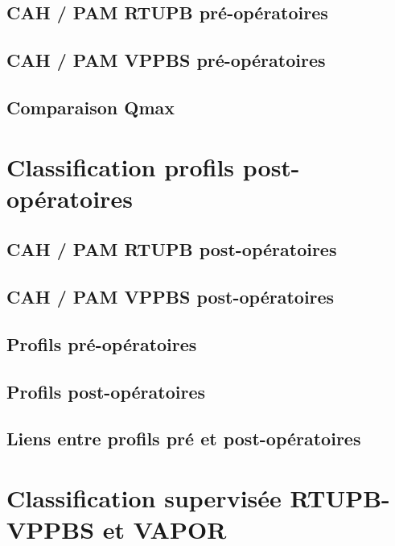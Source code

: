\documentclass[12pt]{article}
\begin{document}
\subsection{CAH / PAM RTUPB pré-opératoires }
	  
\subsection{CAH / PAM VPPBS  pré-opératoires }
	  
\subsection{Comparaison Qmax }
	  

%


\section{Classification profils post-opératoires}
\subsection{CAH / PAM RTUPB post-opératoires}
	  
\subsection{CAH / PAM VPPBS post-opératoires}
	  
\subsection{Profils pré-opératoires}
	  
\subsection{Profils post-opératoires}
	  
\subsection{Liens entre profils pré et post-opératoires}
	  

\section{Classification supervisée RTUPB-VPPBS et VAPOR}
\end{document}
